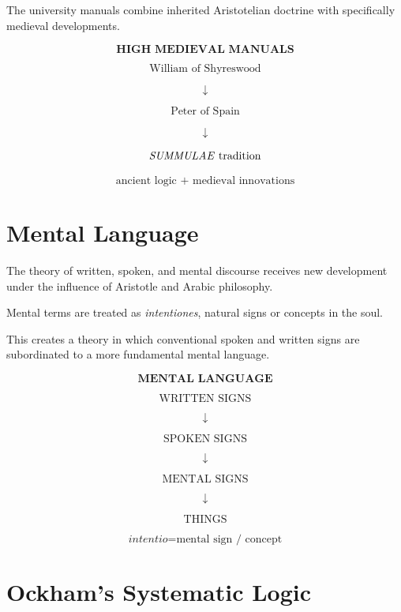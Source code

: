 \documentclass[11pt]{article}
\newcommand{\latin}[1]{\textit{#1}}
\begin{document}
The university manuals combine inherited Aristotelian doctrine
with specifically medieval developments.

\begin{whiteboard}
\[
\textbf{HIGH MEDIEVAL MANUALS}
\]

\[
\text{William of Shyreswood}
\]

\[
\downarrow
\]

\[
\text{Peter of Spain}
\]

\[
\downarrow
\]

\[
\text{\latin{SUMMULAE} tradition}
\]

\[
\boxed{\text{ancient logic + medieval innovations}}
\]
\end{whiteboard}

\section{Mental Language}

The theory of written, spoken, and mental discourse receives new
development under the influence of Aristotle and Arabic
philosophy.

Mental terms are treated as \latin{intentiones}, natural signs or
concepts in the soul.

This creates a theory in which conventional spoken and written
signs are subordinated to a more fundamental mental language.

\begin{whiteboard}
\[
\textbf{MENTAL LANGUAGE}
\]

\[
\text{WRITTEN SIGNS}
\]

\[
\downarrow
\]

\[
\text{SPOKEN SIGNS}
\]

\[
\downarrow
\]

\[
\text{MENTAL SIGNS}
\]

\[
\downarrow
\]

\[
\text{THINGS}
\]

\[
\boxed{\latin{intentio} = \text{mental sign / concept}}
\]
\end{whiteboard}

\section{Ockham's Systematic Logic}
\end{document}
